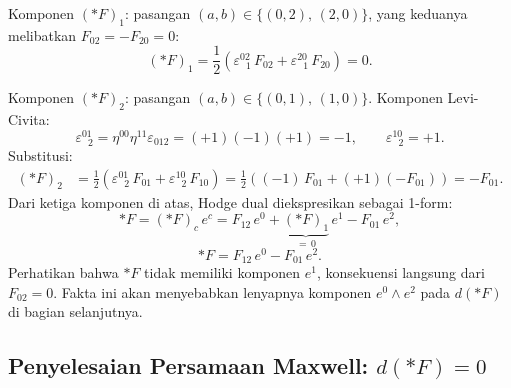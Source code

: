 \noindent Komponen $(*F)_1$: pasangan $(a,b) \in \{(0,2),\,(2,0)\}$, yang keduanya melibatkan $F_{02} = -F_{20} = 0$:
\begin{equation}
    (*F)_1 = \frac{1}{2}\!\left(\varepsilon^{02}_{\ \ \,1}\,F_{02}
    + \varepsilon^{20}_{\ \ \,1}\,F_{20}\right) = 0.
\end{equation}

\noindent Komponen $(*F)_2$: pasangan $(a,b) \in \{(0,1),\,(1,0)\}$. Komponen Levi-Civita:
\begin{equation}
    \varepsilon^{01}_{\ \ \,2} = \eta^{00}\eta^{11}\varepsilon_{012}
    = (+1)(-1)(+1) = -1, \qquad
    \varepsilon^{10}_{\ \ \,2} = +1.
\end{equation}
Substitusi:
\begin{align}
    (*F)_2 &= \frac{1}{2}\!\left(\varepsilon^{01}_{\ \ \,2}\,F_{01}
    + \varepsilon^{10}_{\ \ \,2}\,F_{10}\right)
    = \frac{1}{2}\!\left((-1)\,F_{01} + (+1)(-F_{01})\right)
    = -F_{01}.
\end{align}
Dari ketiga komponen di atas, Hodge dual diekspresikan sebagai 1-form:
\begin{equation}
    *F = (*F)_c\,e^c = F_{12}\,e^0 + \underbrace{(*F)_1}_{=\,0}\,e^1 - F_{01}\,e^2,
\end{equation}
\begin{equation}
    *F = F_{12}\,e^0 - F_{01}\,e^2. \label{mx45-eq:hodge-result}
\end{equation}
Perhatikan bahwa ${*F}$ tidak memiliki komponen $e^1$, konsekuensi langsung dari $F_{02} = 0$. Fakta ini akan menyebabkan lenyapnya komponen $e^0 \wedge e^2$ pada $d({*F})$ di bagian selanjutnya.

\subsection{Penyelesaian Persamaan Maxwell: $d({*F}) = 0$}
\label{mx45-sec:maxwell}

